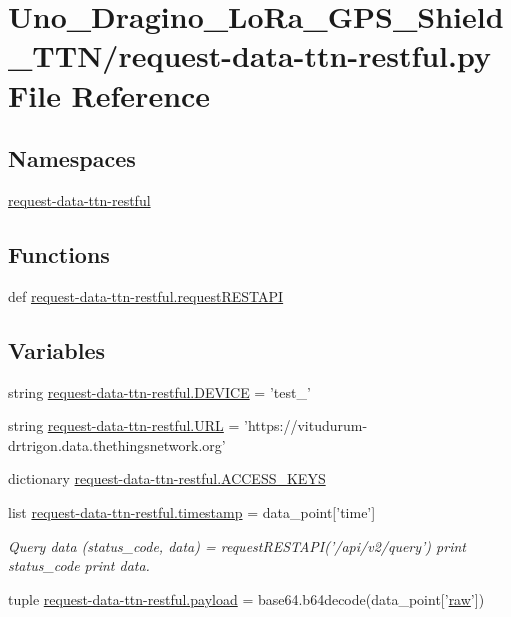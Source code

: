 \hypertarget{request-data-ttn-restful_8py}{\section{Uno\-\_\-\-Dragino\-\_\-\-Lo\-Ra\-\_\-\-G\-P\-S\-\_\-\-Shield\-\_\-\-T\-T\-N/request-\/data-\/ttn-\/restful.py File Reference}
\label{request-data-ttn-restful_8py}
}
\subsection*{Namespaces}
\begin{DoxyCompactItemize}
\item 
\hyperlink{namespacerequest-data-ttn-restful}{request-\/data-\/ttn-\/restful}
\end{DoxyCompactItemize}
\subsection*{Functions}
\begin{DoxyCompactItemize}
\item 
def \hyperlink{namespacerequest-data-ttn-restful_aaddceb415bfcc0aacaeb1b2233fc87ac}{request-\/data-\/ttn-\/restful.\-request\-R\-E\-S\-T\-A\-P\-I}
\end{DoxyCompactItemize}
\subsection*{Variables}
\begin{DoxyCompactItemize}
\item 
string \hyperlink{namespacerequest-data-ttn-restful_ab52fb0a29d93ecf0ce90ac2a1ce186ca}{request-\/data-\/ttn-\/restful.\-D\-E\-V\-I\-C\-E} = 'test\-\_'
\item 
string \hyperlink{namespacerequest-data-ttn-restful_ae8d40a33afa99acaa57ddcb9e61bcbbe}{request-\/data-\/ttn-\/restful.\-U\-R\-L} = 'https\-://vitudurum-\/drtrigon.\-data.\-thethingsnetwork.\-org'
\item 
dictionary \hyperlink{namespacerequest-data-ttn-restful_a48d677de6ac441bcb5410b1ac8bde6bc}{request-\/data-\/ttn-\/restful.\-A\-C\-C\-E\-S\-S\-\_\-\-K\-E\-Y\-S}
\item 
list \hyperlink{namespacerequest-data-ttn-restful_a10b3d06e39c1dd442f2f80a74fc635c1}{request-\/data-\/ttn-\/restful.\-timestamp} = data\-\_\-point\mbox{[}'time'\mbox{]}
\begin{DoxyCompactList}\small\item\em Query data (status\-\_\-code, data) = request\-R\-E\-S\-T\-A\-P\-I('/api/v2/query') print status\-\_\-code print data. \end{DoxyCompactList}\item 
tuple \hyperlink{namespacerequest-data-ttn-restful_a2fb886d92f7defc758a7e48c36217f26}{request-\/data-\/ttn-\/restful.\-payload} = base64.\-b64decode(data\-\_\-point\mbox{[}'\hyperlink{Uno__MultiWii__HardwarePlatform__Test_2Sensors_8cpp_a2ac761123eb9aa3dacd85dc88d857939}{raw}'\mbox{]})
\end{DoxyCompactItemize}
